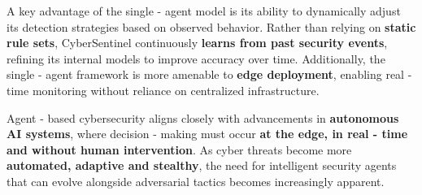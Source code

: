 A key advantage of the single - agent model is its ability to dynamically adjust its detection strategies based on observed behavior. Rather than relying on \textbf{static rule sets}, CyberSentinel continuously \textbf{learns from past security events}, refining its internal models to improve accuracy over time. Additionally, the single - agent framework is more amenable to \textbf{edge deployment}, enabling real - time monitoring without reliance on centralized infrastructure.

Agent - based cybersecurity aligns closely with advancements in \textbf{autonomous AI systems}, where decision - making must occur \textbf{at the edge, in real - time and without human intervention}. As cyber threats become more \textbf{automated, adaptive and stealthy}, the need for intelligent security agents that can evolve alongside adversarial tactics becomes increasingly apparent.